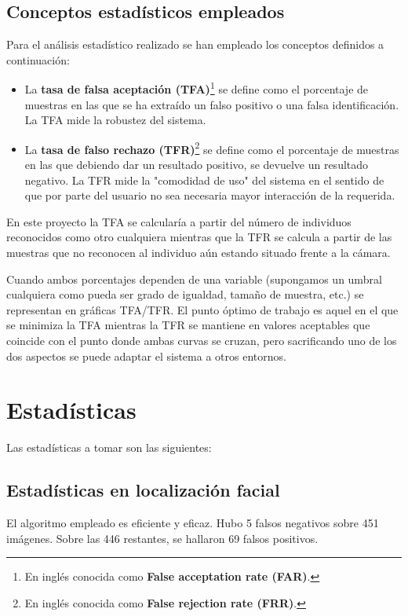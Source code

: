 \subsection{Conceptos estadísticos empleados}
Para el análisis estadístico realizado se han empleado los conceptos definidos a continuación:
\begin{itemize}
	\item{La \textbf{tasa de falsa aceptación (TFA)}\footnote{En inglés conocida como \textbf{False acceptation rate (FAR)}.} se define como el porcentaje de muestras en las que se ha extraído un falso positivo o una falsa identificación. La TFA mide la robustez del sistema.}
	\item{La \textbf{tasa de falso rechazo (TFR)}\footnote{En inglés conocida como \textbf{False rejection rate (FRR)}.} se define como el porcentaje de muestras en las que debiendo dar un resultado positivo, se devuelve un resultado negativo. La TFR mide la "comodidad de uso" del sistema en el sentido de que por parte del usuario no sea necesaria mayor interacción de la requerida. }
\end {itemize}

En este proyecto la TFA se calcularía a partir del número de individuos reconocidos como otro cualquiera mientras que la TFR se calcula a partir de las muestras que no reconocen al individuo aún estando situado frente a la cámara.

Cuando ambos porcentajes dependen de una variable (supongamos un umbral cualquiera como pueda ser grado de igualdad, tamaño de muestra, etc.) se representan en gráficas TFA/TFR. El punto óptimo de trabajo es aquel en el que se minimiza la TFA mientras la TFR se mantiene en valores aceptables que coincide con el punto donde ambas curvas se cruzan, pero sacrificando uno de los dos aspectos se puede adaptar el sistema a otros entornos.

\newpage

\section{Estadísticas}

Las estadísticas a tomar son las siguientes:

\subsection{Estadísticas en localización facial}
El algoritmo empleado es eficiente y eficaz. Hubo 5 falsos negativos sobre 451 imágenes. Sobre las 446 restantes, se hallaron 69 falsos positivos. 


